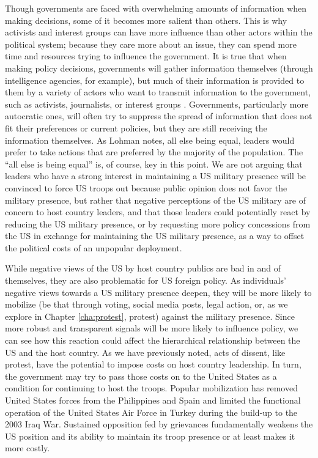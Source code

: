 Though governments are faced with overwhelming amounts of information when making decisions, some of it becomes more salient than others. This is why activists and interest groups can have more influence than other actors within the political system; because they care more about an issue, they can spend more time and resources trying to influence the government.\autocite{Chenoweth2011} It is true that when making policy decisions, governments will gather information themselves (through intelligence agencies, for example), but much of their information is provided to them by a variety of actors who want to transmit information to the government, such as activists, journalists, or interest groups \cite[p.15]{Baumgartner2015}. Governments, particularly more autocratic ones, will often try to suppress the spread of information that does not fit their preferences or current policies, but they are still receiving the information themselves. As Lohman notes, all else being equal, leaders would prefer to take actions that are preferred by the majority of the population.\autocite{Lohmann1993} The ``all else is being equal'' is, of course, key in this point. We are not arguing that leaders who have a strong interest in maintaining a US military presence will be convinced to force US troops out because public opinion does not favor the military presence, but rather that negative perceptions of the US military are of concern to host country leaders, and that those leaders could potentially react by reducing the US military presence, or by requesting more policy concessions from the US in exchange for maintaining the US military presence, as a way to offset the political costs of an unpopular deployment. 

While negative views of the US by host country publics are bad in and of themselves, they are also problematic for US foreign policy.  As individuals' negative views towards a US military presence deepen, they will be more likely to mobilize (be that through voting, social media posts, legal action, or, as we explore in Chapter \ref{cha:protest}, protest) against the military presence. Since more robust and transparent signals will be more likely to influence policy, we can see how this reaction could affect the hierarchical relationship between the US and the host country. As we have previously noted, acts of dissent, like protest, have the potential to impose costs on host country leadership. In turn, the government may try to pass those costs on to the United States as a condition for continuing to host the troops. Popular mobilization has removed United States forces from the Philippines and Spain and limited the functional operation of the United States Air Force in Turkey during the build-up to the 2003 Iraq War.\autocite{Cooley2008,Kakizaki2011} Sustained opposition fed by grievances fundamentally weakens the US position and its ability to maintain its troop presence or at least makes it more costly.

